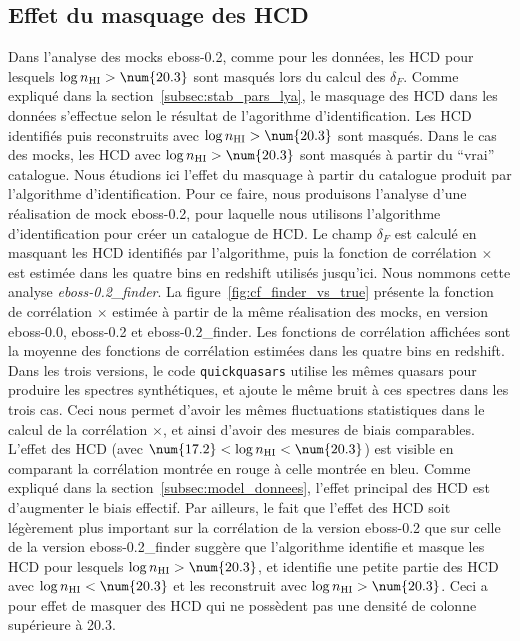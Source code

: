 \subsection{Effet du masquage des HCD}
\label{subsec:effet_masquage_hcd}
Dans l'analyse des mocks eboss-0.2, comme pour les données, les HCD pour lesquels $\log n_{\textsc{HI}} > \num{20.3}$ sont masqués lors du calcul des $\delta_F$.
Comme expliqué dans la section~\ref{subsec:stab_pars_lya}, le masquage des HCD dans les données s'effectue selon le résultat de l'agorithme d'identification. Les HCD identifiés puis reconstruits avec $\log n_{\textsc{HI}} > \num{20.3}$ sont masqués. Dans le cas des mocks, les HCD avec $\log n_{\textsc{HI}} > \num{20.3}$ sont masqués à partir du ``vrai'' catalogue. Nous étudions ici l'effet du masquage à partir du catalogue produit par l'algorithme d'identification.
Pour ce faire, nous produisons l'analyse d'une réalisation de mock eboss-0.2, pour laquelle nous utilisons l'algorithme d'identification pour créer un catalogue de HCD. Le champ $\delta_F$ est calculé en masquant les HCD identifiés par l'algorithme, puis la fonction de corrélation \lya{}$\times$\lya{} est estimée dans les quatre bins en redshift utilisés jusqu'ici. Nous nommons cette analyse \emph{eboss-0.2\_finder}.
La figure~\ref{fig:cf_finder_vs_true} présente la fonction de corrélation \lya{}$\times$\lya{} estimée à partir de la même réalisation des mocks, en version eboss-0.0, eboss-0.2 et eboss-0.2\_finder.
Les fonctions de corrélation affichées sont la moyenne des fonctions de corrélation estimées dans les quatre bins en redshift.
Dans les trois versions, le code \texttt{quickquasars} utilise les mêmes quasars pour produire les spectres synthétiques, et ajoute le même bruit à ces spectres dans les trois cas. Ceci nous permet d'avoir les mêmes fluctuations statistiques dans le calcul de la corrélation \lya{}$\times$\lya{}, et ainsi d'avoir des mesures de biais comparables.
L'effet des HCD (avec $\num{17.2} < \log n_{\textsc{HI}} < \num{20.3}$) est visible en comparant la corrélation montrée en rouge à celle montrée en bleu. Comme expliqué dans la section~\ref{subsec:model_donnees}, l'effet principal des HCD est d'augmenter le biais effectif.
Par ailleurs, le fait que l'effet des HCD soit légèrement plus important sur la corrélation de la version eboss-0.2 que sur celle de la version  eboss-0.2\_finder suggère que l'algorithme identifie et masque les HCD pour lesquels $\log n_{\textsc{HI}} > \num{20.3}$, et identifie une petite partie des HCD avec $\log n_{\textsc{HI}} < \num{20.3}$ et les reconstruit avec $\log n_{\textsc{HI}} > \num{20.3}$. Ceci a pour effet de masquer des HCD qui ne possèdent pas une densité de colonne supérieure à \num{20.3}.

